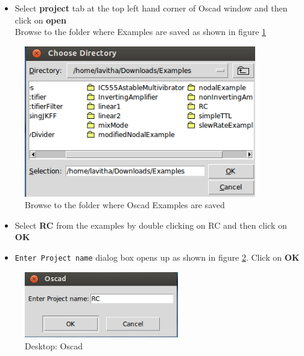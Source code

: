 \newpage
\newpage
\begin{itemize}
\item Select \textbf{project} tab at the top left hand corner of Oscad window and then click on \textbf{open}\\
Browse to the folder where Examples are saved as shown in figure \ref{Rc} 
\end{itemize}
\begin{figure}[h]
\centering
\includegraphics[width=0.9\textwidth]{figures/RC.png}
\caption{Browse to the folder where Oscad Examples are saved}
\label{Rc}
\end{figure}
\begin{itemize}
\item Select \textbf{RC} from the examples by double clicking on RC and then click on \textbf{OK}
\end{itemize}
\begin{itemize}
\item {\tt Enter Project name} dialog box opens up as shown in figure \ref{rcb}. Click on \textbf{OK}
\end{itemize}
\begin{figure}[h!]
\centering
\includegraphics[width=0.6\textwidth]{figures/RC1.png}
\caption{Desktop: Oscad }
\label{rcb}
\end{figure}
